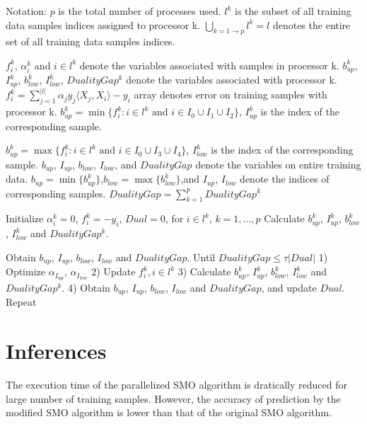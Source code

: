 \documentclass{article}
\begin{document}
		\begin{algorithm}[caption={Parallel SMO Algorithm}]
Notation: $p$ is the total number of processes used.
$l^k$ is the subset of all training data samples indices assigned to processor k.
$\bigcup_{k=1 \rightarrow p} l^k = l$ denotes the entire set of all training data samples indices.

$f_i^k$, $\alpha_i^k$ and $i \in l^k$ denote the variables associated with samples in processor k.
$b_{up}^k$, $I_{up}^k$, $b_{low}^k$, $I_{low}^k$, $DualityGap^k$ denote the variables associated with processor k.
$f_i^k = \sum_{j=1}^{|l|} \alpha_j y_j \langle X_j, X_i \rangle - y_i$ array denotes error on training samples with processor k.
$b_{up}^k = \min\{f_i^k: i \in l^k\text{ and }i \in I_0 \cup I_1 \cup I_2\}$, $I_{up}^k$ is the index of the corresponding sample.

$b_{up}^k = \max\{f_i^k: i \in l^k\text{ and }i \in I_0 \cup I_3 \cup I_4\}$, $I_{low}^k$ is the index of the corresponding sample.
$b_{up}$, $I_{up}$, $b_{low}$, $I_{low}$, and $DualityGap$ denote the variables on entire training data.
$b_{up} = \min\{b_{up}^k\}$,$b_{low} = \max\{b_{low}^k\}$,and $I_{up}$, $I_{low}$ denote the indices of corresponding samples.
$DualityGap = \sum_{k=1}^{p} DualityGap^k$

Initialize $\alpha_i^k = 0$, $f_i^k = -y_i$, $Dual = 0$, for $i \in l^k$, $k=1,\ldots,p$
Calculate $b_{up}^k$, $I_{up}^k$, $b_{low}^k$, $I_{low}^k$ and $DualityGap^k$.

Obtain $b_{up}$, $I_{up}$, $b_{low}$, $I_{low}$ and $DualityGap$.
Until $DualityGap \leq \tau | Dual |$
1) Optimize $\alpha_{I_{up}}$,  $\alpha_{I_{low}}$
2) Update $f_i^k, i \in l^k$
3) Calculate $b_{up}^k$, $I_{up}^k$, $b_{low}^k$, $I_{low}^k$ and $DualityGap^k$.
4) Obtain $b_{up}$, $I_{up}$, $b_{low}$, $I_{low}$ and $DualityGap$, and update $Dual$.
Repeat

		\end{algorithm}

	\section{Inferences}
		The execution time of the parallelized SMO algorithm is dratically reduced for large number of training samples. However, the accuracy of prediction by the modified SMO algorithm is lower than that of the original SMO algorithm.
\pagebreak
\end{document}
